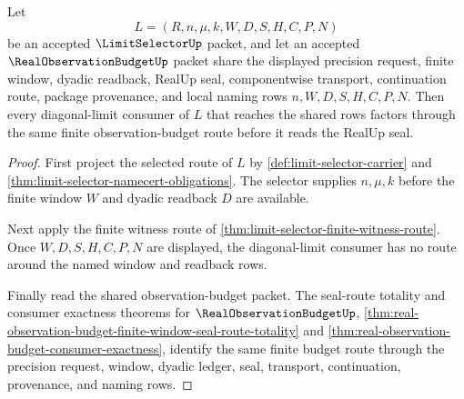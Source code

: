 \begin{theorem}
\label{thm:limit-selector-observation-budget-handoff}
Let
$$
L=(R,n,\mu,k,W,D,S,H,C,P,N)
$$
be an accepted $\LimitSelectorUp$ packet, and let an accepted $\RealObservationBudgetUp$ packet share the displayed precision request, finite window, dyadic readback, RealUp seal, componentwise transport, continuation route, package provenance, and local naming rows $n,W,D,S,H,C,P,N$. Then every diagonal-limit consumer of $L$ that reaches the shared rows factors through the same finite observation-budget route before it reads the RealUp seal.
\end{theorem}
\begin{proof}
First project the selected route of $L$ by \autoref{def:limit-selector-carrier} and \autoref{thm:limit-selector-namecert-obligations}. The selector supplies $n,\mu,k$ before the finite window $W$ and dyadic readback $D$ are available.

Next apply the finite witness route of \autoref{thm:limit-selector-finite-witness-route}. Once $W,D,S,H,C,P,N$ are displayed, the diagonal-limit consumer has no route around the named window and readback rows.

Finally read the shared observation-budget packet. The seal-route totality and consumer exactness theorems for $\RealObservationBudgetUp$, \autoref{thm:real-observation-budget-finite-window-seal-route-totality} and \autoref{thm:real-observation-budget-consumer-exactness}, identify the same finite budget route through the precision request, window, dyadic ledger, seal, transport, continuation, provenance, and naming rows.
\end{proof}

